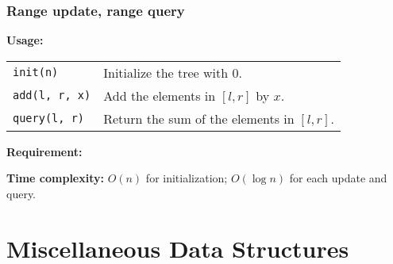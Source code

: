 \subsubsection{Range update, range query}
\textbf{Usage:} \\[0.1cm]
\begin{tabular}{p{3cm} p{8.5cm}}
  \lstinline|init(n)| & Initialize the tree with 0. \\
  \lstinline|add(l, r, x)| & Add the elements in $[l, r]$ by $x$. \\
  \lstinline|query(l, r)| & Return the sum of the elements in $[l, r]$.
\end{tabular} \par
\textbf{Requirement:} \\
 \par
\textbf{Time complexity:} $O(n)$ for initialization; $O(\log n)$ for each update and query. \par


\section{Miscellaneous Data Structures}
%

